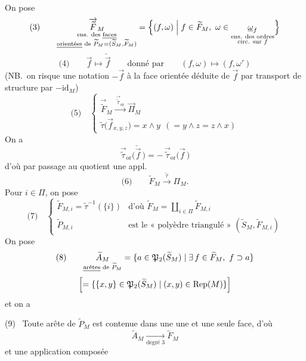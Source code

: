 \documentclass[11pt,a4paper]{article}
\begin{document}
On pose
\[
\text{(3)}\qquad
\underset{\substack{\text{ens. des \emph{faces}}\\ \text{\emph{orientées} de } \widetilde{P}_M=(\widetilde{S}_M,\widetilde{F}_M)}}{\overrightarrow{\widetilde{F}}_M}
= \Bigl\{(f,\omega)\Bigm| f\in\widetilde{F}_M,\ \omega\in\underset{\substack{\text{ens. des ordres}\\ \text{circ. sur } f}}{\underline{\omega}_f}\Bigr\}
\]
\[
\text{(4)}\qquad \vec{f}\longmapsto\check{\vec{f}}
\qquad\text{donné par}\qquad (f,\omega)\longmapsto(f,\omega')
\]
(NB.\ on \struck{\ill{}} risque une notation $-\vec{f}$ à la face orientée déduite de $\vec{f}$ par transport de structure par $-\mathrm{id}_M$)
\[
\text{(5)}\quad
\left\{
\begin{array}{l}
\overrightarrow{\widetilde{F}}_M \xrightarrow{\ \vec{\widetilde{\tau}}_{\mathrm{or}}\ } \overrightarrow{\Pi}_M\\[4pt]
\widetilde{\tau}\bigl(\vec{f}_{x,y,z}\bigr) = x\wedge y\ \ (=y\wedge z=z\wedge x)
\end{array}
\right.
\]
On a
\[
\vec{\widetilde{\tau}}_{\mathrm{or}}\bigl(\check{\vec{f}}\,\bigr) = -\,\vec{\widetilde{\tau}}_{\mathrm{or}}\bigl(\vec{f}\,\bigr)
\]
d'où par passage au quotient une appl.
\[
\text{(6)}\qquad \widetilde{F}_M \xrightarrow{\ \widetilde{\tau}\ } \Pi_M .
\]
Pour $i\in\Pi$, on pose
\[
\text{(7)}\quad
\left\{
\begin{array}{ll}
\widetilde{F}_{M,i} = \widetilde{\tau}^{-1}(\{i\}) & \text{d'où } \widetilde{F}_M = \coprod_{i\in\Pi}\widetilde{F}_{M,i}\\[4pt]
\widetilde{P}_{M,i} & \text{est le « polyèdre triangulé » } (\widetilde{S}_M,\widetilde{F}_{M,i})
\end{array}
\right.
\]
 On pose
\[
\text{(8)}\qquad
\underset{\text{\emph{arêtes} de } \widetilde{P}_M}{\widetilde{A}_M} = \{a\in\mathfrak{P}_2(\widetilde{S}_M)\mid \exists\, f\in\widetilde{F}_M,\ f\supset a\}
\]
\[
\Bigl[=\{\{x,y\}\in\mathfrak{P}_2(\widetilde{S}_M)\mid (x,y)\in\mathrm{Rep}(M)\}\Bigr]
\]
et on a

(9)\  Toute arête de $\widetilde{P}_M$ est contenue dans une  une et une seule face, d'où
\[
\widetilde{A}_M \xrightarrow[\text{degré 3}]{} \widetilde{F}_M
\]
et une application composée
\end{document}
